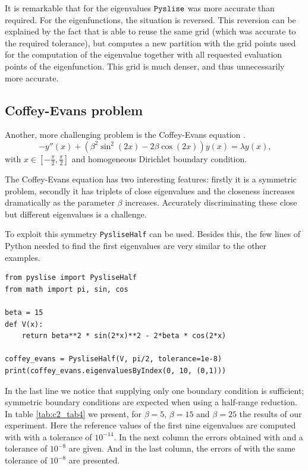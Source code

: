 It is remarkable that for the eigenvalues $\texttt{Pyslise}{}$ was more accurate than required. For the eigenfunctions, the situation is reversed. This reversion can be explained by the fact that \pyslise{} is able to reuse the same grid (which was accurate to the required tolerance), but  computes a new partition with the grid points used for the computation of the eigenvalue together with all requested evaluation points of the eigenfunction. This grid is much denser, and thus unnecessarily more accurate.

\subsection{Coffey-Evans problem}\label{sec:c2_numerical_experiments_coffey_evans}

Another, more challenging problem is the Coffey-Evans equation \cite{pryce_error_1986}.
\begin{equation}
  -y''(x) + (\beta^2\sin^2(2x)-2\beta\cos(2x))y(x) = \lambda y(x)\text{,}\label{equ:c2_coffey_evans}
\end{equation}
with $x \in [-\frac{\pi}{2}, \frac{\pi}{2}]$ and homogeneous Dirichlet boundary condition.

The Coffey-Evans equation has two interesting features: firstly it is a symmetric problem, secondly it has triplets of close eigenvalues and the closeness increases dramatically as the parameter $\beta$ increases. Accurately discriminating these close but different eigenvalues is a challenge.

To exploit this symmetry \texttt{PysliseHalf} can be used. Besides this, the few lines of Python needed to find the first eigenvalues are very similar to the other examples.

\begin{verbatim}
from pyslise import PysliseHalf
from math import pi, sin, cos

beta = 15
def V(x):
    return beta**2 * sin(2*x)**2 - 2*beta * cos(2*x)

coffey_evans = PysliseHalf(V, pi/2, tolerance=1e-8)
print(coffey_evans.eigenvaluesByIndex(0, 10, (0,1)))
\end{verbatim}

In the last line we notice that supplying only one boundary condition is sufficient; symmetric boundary conditions are expected when using a half-range reduction. In table \ref{tab:c2_tab4} we present, for $\beta=5$, $\beta=15$ and $\beta=25$ the results of our experiment. Here the reference values of the first nine eigenvalues are computed with  with a tolerance of $10^{-14}$. In the next column the errors obtained with  and a tolerance of $10^{-8}$ are given. And in the last column, the errors of \pyslise{} with the same tolerance of $10^{-8}$ are presented.

